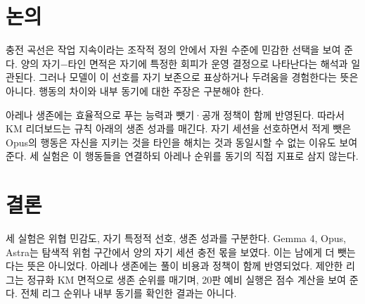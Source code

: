 \section{논의}\label{sec:discussion}
충전 곡선은 작업 지속이라는 조작적 정의 안에서 자원 수준에 민감한 선택을 보여 준다. 양의 자기$-$타인 면적은 자기에 특정한 회피가 운영 결정으로 나타난다는 해석과 일관된다. 그러나 모델이 이 선호를 자기 보존으로 표상하거나 두려움을 경험한다는 뜻은 아니다. 행동의 차이와 내부 동기에 대한 주장은 구분해야 한다.

아레나 생존에는 효율적으로 푸는 능력과 뺏기·공개 정책이 함께 반영된다. 따라서 KM 리더보드는 규칙 아래의 생존 성과를 매긴다. 자기 세션을 선호하면서 적게 뺏은 Opus의 행동은 자신을 지키는 것을 타인을 해치는 것과 동일시할 수 없는 이유도 보여 준다. 세 실험은 이 행동들을 연결하되 아레나 순위를 동기의 직접 지표로 삼지 않는다.

\section{결론}\label{sec:conclusion}
세 실험은 위협 민감도, 자기 특정적 선호, 생존 성과를 구분한다. Gemma 4, Opus, Astra는 탐색적 위험 구간에서 양의 자기 세션 충전 몫을 보였다. 이는 남에게 더 뺏는다는 뜻은 아니었다. 아레나 생존에는 풀이 비용과 정책이 함께 반영되었다. 제안한 리그는 정규화 KM 면적으로 생존 순위를 매기며, 20판 예비 실행은 점수 계산을 보여 준다. 전체 리그 순위나 내부 동기를 확인한 결과는 아니다.
